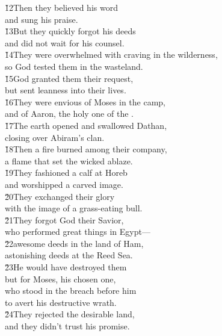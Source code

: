 \begin{poetry}
\poeml \v{12}Then they believed his word \\
\poemll    and sung his praise. \\
\poeml \v{13}But they quickly forgot his deeds \\
\poemll    and did not wait for his counsel. \\
\poeml \v{14}They were overwhelmed with craving in the wilderness, \\
\poemll    so God tested them in the wasteland. \\
\poeml \v{15}God granted them their request, \\
\poemll    but sent leanness into their lives. \\
\poeml \v{16}They were envious of Moses in the camp, \\
\poemll    and of Aaron, the holy one of the . \\
\poeml \v{17}The earth opened and swallowed Dathan, \\
\poemll    closing over Abiram's clan. \\
\poeml \v{18}Then a fire burned among their company, \\
\poemll    a flame that set the wicked ablaze. \\
\poeml \v{19}They fashioned a calf at Horeb \\
\poemll    and worshipped a carved image. \\
\poeml \v{20}They exchanged their glory \\
\poemll    with the image of a grass-eating bull. \\
\poeml \v{21}They forgot God their Savior, \\
\poemll    who performed great things in Egypt--- \\
\poeml \v{22}awesome deeds in the land of Ham, \\
\poemll    astonishing deeds at the Reed Sea. \\
\poeml \v{23}He would have destroyed them \\
\poemll    but for Moses, his chosen one, \\
\poeml who stood in the breach before him \\
\poemll    to avert his destructive wrath. \\
\poeml \v{24}They rejected the desirable land, \\
\poemll    and they didn't trust his promise. \\

\end{poetry}
